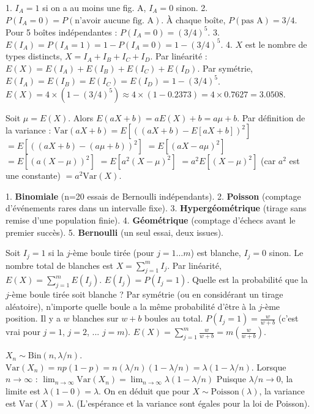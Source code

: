 \begin{correctionbox}
1. $I_A = 1$ si on a au moins une fig. A, $I_A = 0$ sinon.
2. $P(I_A=0) = P(\text{n'avoir aucune fig. A})$. À chaque boîte, $P(\text{pas A}) = 3/4$.
Pour 5 boîtes indépendantes : $P(I_A=0) = (3/4)^5$.
3. $E(I_A) = P(I_A=1) = 1 - P(I_A=0) = 1 - (3/4)^5$.
4. $X$ est le nombre de types distincts, $X = I_A + I_B + I_C + I_D$.
Par linéarité : $E(X) = E(I_A) + E(I_B) + E(I_C) + E(I_D)$.
Par symétrie, $E(I_A) = E(I_B) = E(I_C) = E(I_D) = 1 - (3/4)^5$.
$E(X) = 4 \times \left( 1 - (3/4)^5 \right) \approx 4 \times (1 - 0.2373) = 4 \times 0.7627 = 3.0508$.
\end{correctionbox}

\begin{correctionbox}
Soit $\mu = E(X)$. Alors $E(aX+b) = aE(X)+b = a\mu+b$.
Par définition de la variance :
$\text{Var}(aX+b) = E\left[ ( (aX+b) - E[aX+b] )^2 \right]$
$= E\left[ ( (aX+b) - (a\mu+b) )^2 \right]$
$= E\left[ ( aX - a\mu )^2 \right]$
$= E\left[ ( a(X - \mu) )^2 \right]$
$= E\left[ a^2 (X - \mu)^2 \right]$
$= a^2 E\left[ (X - \mu)^2 \right]$ (car $a^2$ est une constante)
$= a^2 \text{Var}(X)$.
\end{correctionbox}

\begin{correctionbox}
1. \textbf{Binomiale} (n=20 essais de Bernoulli indépendants).
2. \textbf{Poisson} (comptage d'événements rares dans un intervalle fixe).
3. \textbf{Hypergéométrique} (tirage sans remise d'une population finie).
4. \textbf{Géométrique} (comptage d'échecs avant le premier succès).
5. \textbf{Bernoulli} (un seul essai, deux issues).
\end{correctionbox}

\begin{correctionbox}
Soit $I_j = 1$ si la $j$-ème boule tirée (pour $j=1 \dots m$) est blanche, $I_j=0$ sinon.
Le nombre total de blanches est $X = \sum_{j=1}^m I_j$.
Par linéarité, $E(X) = \sum_{j=1}^m E(I_j)$.
$E(I_j) = P(I_j=1)$. Quelle est la probabilité que la $j$-ème boule tirée soit blanche ?
Par symétrie (ou en considérant un tirage aléatoire), n'importe quelle boule a la même probabilité d'être à la $j$-ème position. Il y a $w$ blanches sur $w+b$ boules au total.
$P(I_j=1) = \frac{w}{w+b}$ (c'est vrai pour $j=1$, $j=2$, ... $j=m$).
$E(X) = \sum_{j=1}^m \frac{w}{w+b} = m \left( \frac{w}{w+b} \right)$.
\end{correctionbox}

\begin{correctionbox}
$X_n \sim \text{Bin}(n, \lambda/n)$.
$\text{Var}(X_n) = np(1-p) = n(\lambda/n)(1 - \lambda/n) = \lambda(1 - \lambda/n)$.
Lorsque $n \to \infty$ :
$\lim_{n \to \infty} \text{Var}(X_n) = \lim_{n \to \infty} \lambda(1 - \lambda/n)$
Puisque $\lambda/n \to 0$, la limite est $\lambda(1 - 0) = \lambda$.
On en déduit que pour $X \sim \text{Poisson}(\lambda)$, la variance est $\text{Var}(X) = \lambda$.
(L'espérance et la variance sont égales pour la loi de Poisson).
\end{correctionbox}
